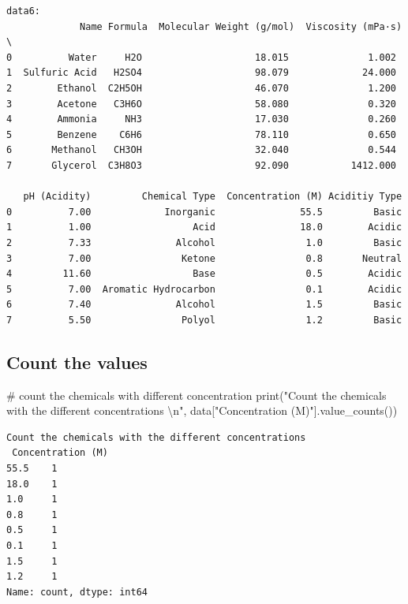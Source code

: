 \documentclass[
  letterpaper,
  DIV=11,
  numbers=noendperiod]{scrreprt}
\newenvironment{Shaded}{\begin{snugshade}}{\end{snugshade}}
\newcommand{\BuiltInTok}[1]{\textcolor[rgb]{0.00,0.23,0.31}{#1}}
\newcommand{\CharTok}[1]{\textcolor[rgb]{0.13,0.47,0.30}{#1}}
\newcommand{\CommentTok}[1]{\textcolor[rgb]{0.37,0.37,0.37}{#1}}
\newcommand{\NormalTok}[1]{\textcolor[rgb]{0.00,0.23,0.31}{#1}}
\newcommand{\StringTok}[1]{\textcolor[rgb]{0.13,0.47,0.30}{#1}}
\begin{document}
\begin{verbatim}
data6: 
             Name Formula  Molecular Weight (g/mol)  Viscosity (mPa·s)  \
0          Water     H2O                    18.015              1.002   
1  Sulfuric Acid   H2SO4                    98.079             24.000   
2        Ethanol  C2H5OH                    46.070              1.200   
3        Acetone   C3H6O                    58.080              0.320   
4        Ammonia     NH3                    17.030              0.260   
5        Benzene    C6H6                    78.110              0.650   
6       Methanol   CH3OH                    32.040              0.544   
7       Glycerol  C3H8O3                    92.090           1412.000   

   pH (Acidity)         Chemical Type  Concentration (M) Aciditiy Type  
0          7.00             Inorganic               55.5         Basic  
1          1.00                  Acid               18.0        Acidic  
2          7.33               Alcohol                1.0         Basic  
3          7.00                Ketone                0.8       Neutral  
4         11.60                  Base                0.5        Acidic  
5          7.00  Aromatic Hydrocarbon                0.1        Acidic  
6          7.40               Alcohol                1.5         Basic  
7          5.50                Polyol                1.2         Basic  
\end{verbatim}

\subsection*{Count the values}\label{count-the-values}

\begin{Shaded}
\begin{Highlighting}[]
\CommentTok{\# count the chemicals with different concentration}
\BuiltInTok{print}\NormalTok{(}\StringTok{"Count the chemicals with the different concentrations }\CharTok{\textbackslash{}n}\StringTok{"}\NormalTok{, data[}\StringTok{"Concentration (M)"}\NormalTok{].value\_counts())}
\end{Highlighting}
\end{Shaded}

\begin{verbatim}
Count the chemicals with the different concentrations 
 Concentration (M)
55.5    1
18.0    1
1.0     1
0.8     1
0.5     1
0.1     1
1.5     1
1.2     1
Name: count, dtype: int64
\end{verbatim}
\end{document}
